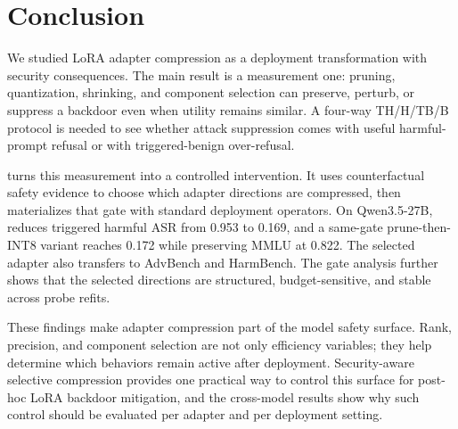 \section{Conclusion}

We studied LoRA adapter compression as a deployment transformation with security consequences.
The main result is a measurement one: pruning, quantization, shrinking, and component selection can preserve, perturb, or suppress a backdoor even when utility remains similar.
A four-way TH/H/TB/B protocol is needed to see whether attack suppression comes with useful harmful-prompt refusal or with triggered-benign over-refusal.

\sac{} turns this measurement into a controlled intervention.
It uses counterfactual safety evidence to choose which adapter directions are compressed, then materializes that gate with standard deployment operators.
On Qwen3.5-27B, \sac{} reduces triggered harmful ASR from 0.953 to 0.169, and a same-gate prune-then-INT8 variant reaches 0.172 while preserving MMLU at 0.822.
The selected adapter also transfers to AdvBench and HarmBench.
The gate analysis further shows that the selected directions are structured, budget-sensitive, and stable across probe refits.

These findings make adapter compression part of the model safety surface.
Rank, precision, and component selection are not only efficiency variables; they help determine which behaviors remain active after deployment.
Security-aware selective compression provides one practical way to control this surface for post-hoc LoRA backdoor mitigation, and the cross-model results show why such control should be evaluated per adapter and per deployment setting.
